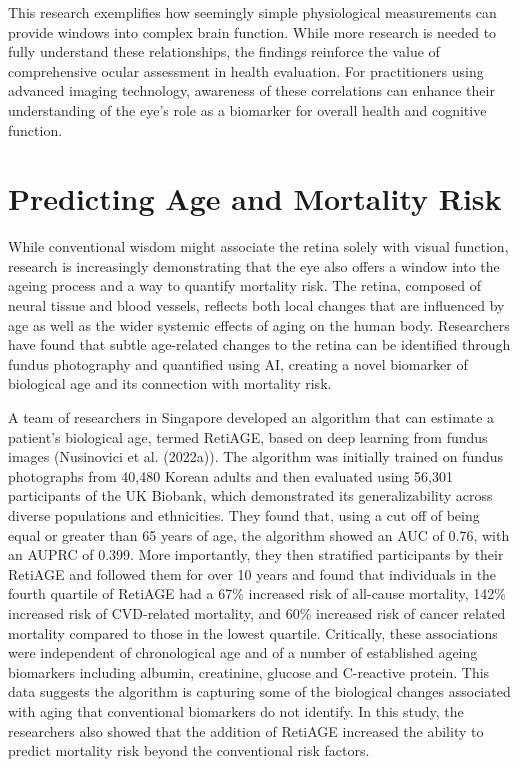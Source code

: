 \documentclass[
  Letterpaper,
]{scrbook}
\begin{document}
This research exemplifies how seemingly simple physiological
measurements can provide windows into complex brain function. While more
research is needed to fully understand these relationships, the findings
reinforce the value of comprehensive ocular assessment in health
evaluation. For practitioners using advanced imaging technology,
awareness of these correlations can enhance their understanding of the
eye's role as a biomarker for overall health and cognitive function.

\section{Predicting Age and Mortality
Risk}\label{predicting-age-and-mortality-risk}

While conventional wisdom might associate the retina solely with visual
function, research is increasingly demonstrating that the eye also
offers a window into the ageing process and a way to quantify mortality
risk. The retina, composed of neural tissue and blood vessels, reflects
both local changes that are influenced by age as well as the wider
systemic effects of aging on the human body. Researchers have found that
subtle age-related changes to the retina can be identified through
fundus photography and quantified using AI, creating a novel biomarker
of biological age and its connection with mortality risk.

A team of researchers in Singapore developed an algorithm that can
estimate a patient's biological age, termed RetiAGE, based on deep
learning from fundus images (Nusinovici et al. (2022a)). The algorithm
was initially trained on fundus photographs from 40,480 Korean adults
and then evaluated using 56,301 participants of the UK Biobank, which
demonstrated its generalizability across diverse populations and
ethnicities. They found that, using a cut off of being equal or greater
than 65 years of age, the algorithm showed an AUC of 0.76, with an AUPRC
of 0.399. More importantly, they then stratified participants by their
RetiAGE and followed them for over 10 years and found that individuals
in the fourth quartile of RetiAGE had a 67\% increased risk of all-cause
mortality, 142\% increased risk of CVD-related mortality, and 60\%
increased risk of cancer related mortality compared to those in the
lowest quartile. Critically, these associations were independent of
chronological age and of a number of established ageing biomarkers
including albumin, creatinine, glucose and C-reactive protein. This data
suggests the algorithm is capturing some of the biological changes
associated with aging that conventional biomarkers do not identify. In
this study, the researchers also showed that the addition of RetiAGE
increased the ability to predict mortality risk beyond the conventional
risk factors.
\end{document}
